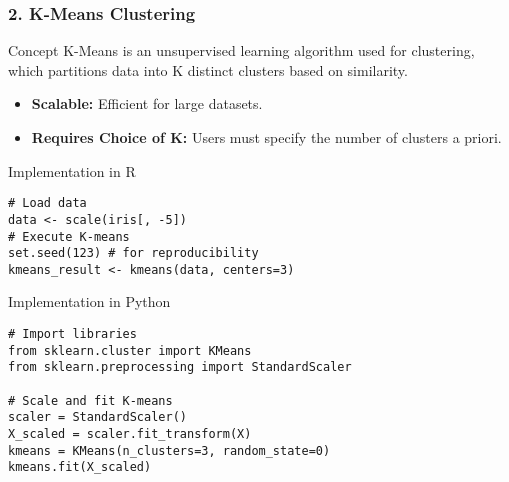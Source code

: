 \documentclass{beamer}
\begin{document}
\begin{frame}[fragile]
    \frametitle{2. K-Means Clustering}
    \begin{block}{Concept}
        K-Means is an unsupervised learning algorithm used for clustering, which partitions data into K distinct clusters based on similarity.
    \end{block}

    \begin{itemize}
        \item \textbf{Scalable:} Efficient for large datasets.
        \item \textbf{Requires Choice of K:} Users must specify the number of clusters a priori.
    \end{itemize}

    \begin{block}{Implementation in R}
        \begin{lstlisting}
# Load data
data <- scale(iris[, -5])
# Execute K-means
set.seed(123) # for reproducibility
kmeans_result <- kmeans(data, centers=3)
        \end{lstlisting}
    \end{block}

    \begin{block}{Implementation in Python}
        \begin{lstlisting}
# Import libraries
from sklearn.cluster import KMeans
from sklearn.preprocessing import StandardScaler

# Scale and fit K-means
scaler = StandardScaler()
X_scaled = scaler.fit_transform(X)
kmeans = KMeans(n_clusters=3, random_state=0)
kmeans.fit(X_scaled)
        \end{lstlisting}
    \end{block}
\end{frame}
\end{document}
